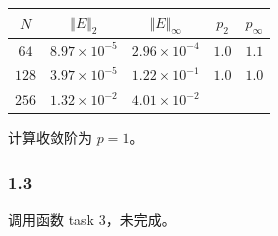 \documentclass[12pt]{ctexart}
\begin{document}
\begin{tabular}{c|c|c|c|c}
	$N$   &  $\Vert E\Vert _2$    &  $\Vert E\Vert_\infty$  &  $p_2$&  $p_\infty$  \\
	\hline
	$64$   &  $8.97\times 10^{-5}$    &  $2.96\times 10^{-4}$  & $1.0$ & $1.1$ \\
	$128$   &  $3.97\times 10^{-5}$    &  $1.22\times 10^{-1}$  & $1.0$  & $1.0$ \\
	$256$   &  $1.32\times 10^{-2}$    &  $4.01\times 10^{-2}$  & & \\
\end{tabular}

计算收敛阶为 $p=1$。

\subsubsection*{1.3}

调用函数 task 3，未完成。
\end{document}
